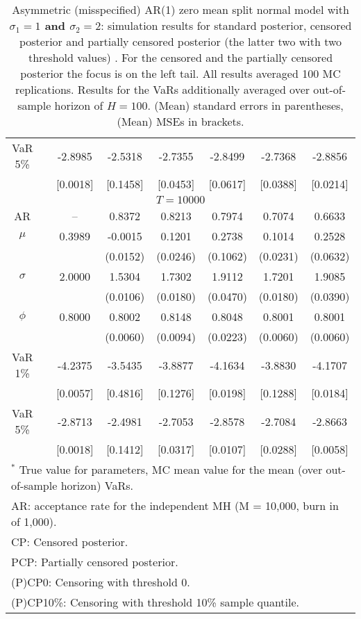 {\begin{table}
\begin{tabular}{cc cccccc}
VaR 5\% && -2.8985 & -2.5318 & -2.7355 & -2.8499 & -2.7368 & -2.8856 \\ 
 && [0.0018] & [0.1458] & [0.0453] & [0.0617] & [0.0388] & [0.0214] \\ 
\hline 
\multicolumn{8}{c}{$T =10000$}  \\ 
\hline 
AR && -- & 0.8372 & 0.8213 & 0.7974 & 0.7074 & 0.6633 \\  
$\mu$&& 0.3989 & -0.0015 & 0.1201 & 0.2738 & 0.1014 & 0.2528 \\ 
&&   & (0.0152) & (0.0246) & (0.1062) & (0.0231) & (0.0632) \\ 
$\sigma$&& 2.0000 & 1.5304 & 1.7302 & 1.9112 & 1.7201 & 1.9085 \\ 
&&   & (0.0106) & (0.0180) & (0.0470) & (0.0180) & (0.0390) \\ 
$\phi$&& 0.8000 & 0.8002 & 0.8148 & 0.8048 & 0.8001 & 0.8001 \\ 
&&   & (0.0060) & (0.0094) & (0.0223) & (0.0060) & (0.0060) \\ 
VaR 1\% && -4.2375 & -3.5435 & -3.8877 & -4.1634 & -3.8830 & -4.1707 \\ 
  && [0.0057] & [0.4816] & [0.1276] & [0.0198] & [0.1288] & [0.0184] \\ 
VaR 5\% && -2.8713 & -2.4981 & -2.7053 & -2.8578 & -2.7084 & -2.8663 \\ 
 && [0.0018] & [0.1412] & [0.0317] & [0.0107] & [0.0288] & [0.0058] \\ 
\hline 
\multicolumn{8}{l}{\footnotesize{$^*$ True value for parameters, MC mean value for the mean (over out-of-sample horizon) VaRs.}}  \\ 
\multicolumn{8}{l}{\footnotesize{AR: acceptance rate for the independent MH (M = 10,000, burn in of 1,000).}}  \\ 
\multicolumn{8}{l}{\footnotesize{CP: Censored posterior.}}  \\ 
\multicolumn{8}{l}{\footnotesize{PCP: Partially censored posterior.}} \\ 
\multicolumn{8}{l}{\footnotesize{(P)CP0: Censoring with threshold 0.}} \\ 
\multicolumn{8}{l}{\footnotesize{(P)CP10\%: Censoring with threshold 10\% sample quantile.}}  \\ 
\end{tabular}
 \caption{Asymmetric (misspecified) AR(1) zero mean split normal model with \textbf{$\sigma_{1} = 1$ and $\sigma_{2} = 2$}: simulation results for standard posterior, censored posterior and partially censored posterior (the latter two with two threshold values) . For the censored and the partially censored posterior the focus is on the left tail. All results averaged 100 MC replications. Results for the VaRs additionally averaged over out-of-sample horizon of $H=100$. (Mean) standard errors in parentheses, (Mean) MSEs in brackets.} 
\label{tab:ar1_pcp}  
\end{table}
}
